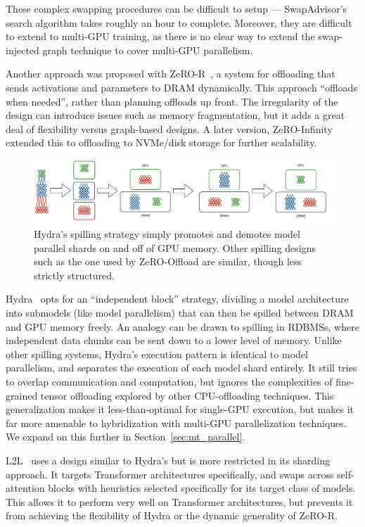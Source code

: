 These complex swapping procedures can be difficult to setup --- SwapAdvisor's search algorithm takes roughly an hour to complete. Moreover, they are difficult to extend to multi-GPU training, as there is no clear way to extend the swap-injected graph technique to cover multi-GPU parallelism.

Another approach was proposed with ZeRO-R~\cite{zero2019}, a system for offloading that sends activations and parameters to DRAM dynamically. This approach ``offloads when needed'', rather than planning offloads up front. The irregularity of the design can introduce issues such as memory fragmentation, but it adds a great deal of flexibility versus graph-based designs. A later version, ZeRO-Infinity~\cite{zero2021} extended this to offloading to NVMe/disk storage for further scalability.

\begin{figure}[th!]
\centering
	\includegraphics[keepaspectratio=true, width=\linewidth]{images/model_spilling}
	\caption{Hydra's spilling strategy simply promotes and demotes model parallel shards on and off of GPU memory. Other spilling designs such as the one used by ZeRO-Offload are similar, though less strictly structured.}
	\label{fig:shard_parallel}
\end{figure}

Hydra~\cite{hydra2021} opts for an ``independent block'' strategy, dividing a model architecture into submodels (like model parallelism) that can then be spilled between DRAM and GPU memory freely. An analogy can be drawn to spilling in RDBMSs, where independent data chunks can be sent down to a lower level of memory. Unlike other spilling systems, Hydra's execution pattern is identical to model parallelism, and separates the execution of each model shard entirely. It still tries to overlap communication and computation, but ignores the complexities of fine-grained tensor offloading explored by other CPU-offloading techniques. This generalization makes it less-than-optimal for single-GPU execution, but makes it far more amenable to hybridization with multi-GPU parallelization techniques. We expand on this further in Section~\ref{sec:mt_parallel}.

L2L~\cite{l2l2020} uses a design similar to Hydra's but is more restricted in its sharding approach. It targets Transformer architectures specifically, and swaps across self-attention blocks with heuristics selected specifically for its target class of models. This allows it to perform very well on Transformer architectures, but prevents it from achieving the flexibility of Hydra or the dynamic generality of ZeRO-R.

